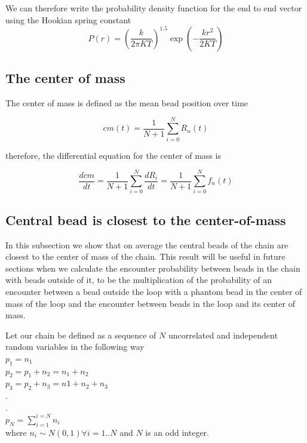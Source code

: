 \documentclass{report}
\begin{document}
We can therefore write the probability density function for the end to end vector using the Hookian spring constant
\begin{equation*}
P(r)= \left(\frac{k}{2\pi KT}\right)^{1.5}\exp\left(-\frac{k r^2}{2KT}\right)
\end{equation*}

\subsection{The center of mass}\label{subsection_theCenterOfMass}

The center of mass is defined as the mean bead position over time 

\begin{equation*}
cm(t) = \frac{1}{N+1}\sum_{i=0}^N{R_n(t)}
\end{equation*}

therefore, the differential equation for the center of mass is 

\begin{equation*}
\frac{dcm}{dt}=\frac{1}{N+1}\sum_{i=0}^N{\frac{dR_i}{dt}}= \frac{1}{N+1}\sum_{i=0}^Nf_n(t)
\end{equation*}

\subsection{Central bead is closest to the center-of-mass}\label{subsection_centralbeadClosestToCenterOfMass}
In this subsection we show that on average the central beads of the chain are closest to the center of mass of the chain. This result will be useful in future sections when we calculate the encounter probability between beads in the chain with beads outside of it, to be the multiplication of the probability of an encounter between a bead outside the loop with a phantom bead in the center of mass of the loop and the encounter between beads in the loop and its center of mass. 

Let our chain be defined as a sequence of $N$ uncorrelated and independent random variables in the following way\\
$p_1 = n_1$\\
$p_2 = p_1+n_2=n_1+n_2$\\
$p_3 = p_2+n_3=n1+n_2+n_3$\\
.\\
.\\
$p_N = \sum_{i=1}^{i=N}n_i$\\
where $n_i\sim N(0,1)\forall i=1..N$ and $N$ is an odd integer.
\end{document}
